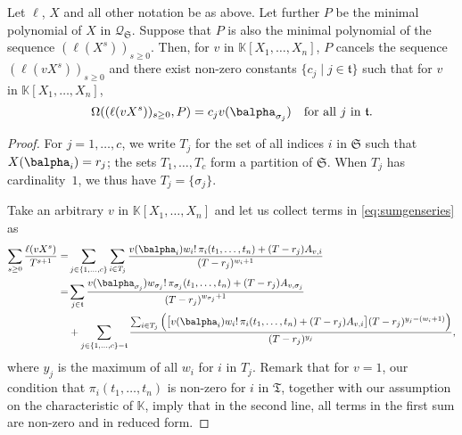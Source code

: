 \documentclass[12pt]{article}
\newcommand{\minpoly}{P}
\newcommand{\lf}{X}
\newcommand{\residueI}{\mathscr{Q}}
\def\K{\mathbb{K}}
\def\K {\ensuremath{\mathbb{K}}}
\begin{document}
\begin{lemma} \label{lemma:anyv}
  Let $\ell$, $\lf$ and all other notation be as above. Let further
  $\minpoly$ be the minimal polynomial of $\lf$ in
  $\residueI_\mathfrak{S}$. Suppose that $\minpoly$ is also the minimal
  polynomial of the sequence $(\ell(\lf^s))_{s \ge 0}$. Then,
 for $v$ in $\K[X_1,\dots,X_n]$, $\minpoly$
  cancels the sequence $(\ell(v \lf^s))_{s\ge0}$ and
there
  exist non-zero constants $\{c_j \mid j \in \mathfrak{t}\}$ such that
  for $v$ in $\K[X_1,\dots,X_n]$,
  $$\Omega((\ell(v \lf^s))_{s\ge0},\minpoly) = c_{j} v(\balpha_{\sigma_j}) \quad \text{for all $j$ in $\mathfrak{t}$.}$$
\end{lemma}
\begin{proof}
  For $j=1,\dots,c$, we write $T_j$ for the set of all indices $i$ in
  $\mathfrak{S}$ such that $\lf(\balpha_{i})=r_j$; the sets
  $T_1,\dots,T_c$ form a partition of $\mathfrak{S}$. When $T_j$ has
  cardinality~$1$, we thus have $T_j=\{\sigma_j\}$.
  
  Take an arbitrary $v$ in $\K[X_1,\dots,X_n]$ and let us
  collect terms in \cref{eq:sumgenseries} as
  \begin{align*}
    \sum_{s \ge 0} \frac{\ell(v \lf^s)}{T^{s+1}} =&
    \sum_{j \in \{1,\dots,c\}}
    \sum_{i \in T_j} \frac{
      v(\balpha_{i})   w_{i}!\, \pi_{i}(t_1,\dots,t_n)
      + (T-r_{j} )A_{v,i}}
	{(T-r_{j} )^{w_{i}+1}}\\
	=&
	\sum_{j \in \mathfrak{t}}
	\frac{
	  v(\balpha_{\sigma_{j}})  w_{\sigma_j}!\, \pi_{\sigma_j}(t_1,\dots,t_n)
	  + (T-r_{j}  )A_{v,\sigma_j} }
	     {(T-r_{j} )^{w_{\sigma_j}+1}}\\
	     &+
	     \sum_{j \in \{1,\dots,c\}-\mathfrak{t}}
	     \frac{   \sum_{i \in T_j} \Big( \big[
		 v(\balpha_{i})   w_{i}!\, \pi_{i}(t_1,\dots,t_n)
		 + (T-r_{j}  )A_{v,i} \big ]
	       (T-r_{j} )^{y_j-(w_i+1)}\Big)}
	          {(T-r_{j} )^{y_j}},
  \end{align*}
  where $y_j$ is the maximum of all $w_i$ for $i$ in $T_j$.  Remark
  that for $v=1$, our condition that $\pi_i(t_1,\dots,t_n)$ is
  non-zero for $i$ in $\mathfrak{T}$, together with our assumption on
  the characteristic of $\K$, imply that in the second line, all terms
  in the first sum are non-zero and in reduced form.
  

\end{proof}
\end{document}
